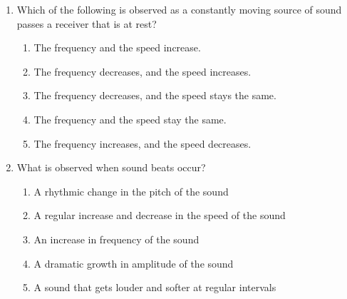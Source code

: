 \documentclass{../../../oss-classkick}
\begin{document}
\begin{multicols}{2}
\begin{enumerate}[leftmargin=18pt,resume]

  \item Which of the following is observed as a constantly moving source of
    sound passes a receiver that is at rest?
    \begin{enumerate}[nosep,leftmargin=18pt,label=(\Alph*)]
    \item The frequency and the speed increase.
    \item The frequency decreases, and the speed increases.
    \item The frequency decreases, and the speed stays the same.
    \item The frequency and the speed stay the same.
    \item The frequency increases, and the speed decreases.
    \end{enumerate}
    \vspace{.7in}
    
  \item What is observed when sound beats occur?
    \begin{enumerate}[nosep,leftmargin=18pt,label=(\Alph*)]
    \item A rhythmic change in the pitch of the sound
    \item A regular increase and decrease in the speed of the sound
    \item An increase in frequency of the sound
    \item A dramatic growth in amplitude of the sound
    \item A sound that gets louder and softer at regular intervals
    \end{enumerate}
    \vspace{.7in}
    

\end{enumerate}
\end{multicols}
\end{document}
